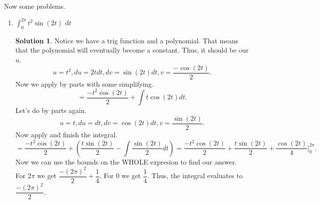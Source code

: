 \documentclass[10pt]{article}
\newcommand{\ds}{\displaystyle}
\theoremstyle{Theorem}
\theoremstyle{definition}
\newtheorem*{solution}{Solution}
\theoremstyle{remark}
\theoremstyle{custom}
\begin{document}
Now some problems.
\begin{enumerate}[1.]
\item $\ds \int_0^{2\pi}t^2\sin(2t) \text{ d}t$
\begin{solution}
Notice we have a trig function and a polynomial. That means that the polynomial will eventually become a constant. Thus, it should be our $u$. 
$$u=t^2, du=2t dt, dv=\sin(2t)dt, v=\dfrac{-\cos(2t)}{2}.$$
Now we apply by parts with some simplifying.
$$=\dfrac{-t^2\cos(2t)}{2}+\int t\cos(2t) dt.$$
Let's do by parts again.
$$u=t, du=dt, dv=\cos(2t)dt, v=\dfrac{\sin(2t)}{2}.$$
Now apply and finish the integral.
$$=\dfrac{-t^2\cos(2t)}{2}+\left( \dfrac{t\sin(2t)}{2}-\int \dfrac{\sin(2t)}{2} dt\right)=\dfrac{-t^2\cos(2t)}{2}+\dfrac{t\sin(2t)}{2}+\dfrac{\cos(2t)}{4}\Big\vert^{2\pi}_0.$$
Now we can use the bounds on the WHOLE expresion to find our answer.\\
For $2\pi$ we get $\dfrac{-(2\pi)^2}{2}+\dfrac{1}{4}$. For $0$ we get $\dfrac{1}{4}$. Thus, the integral evaluates to $\dfrac{-(2\pi)^2}{2}$.


\end{solution}
\end{enumerate}
\end{document}

